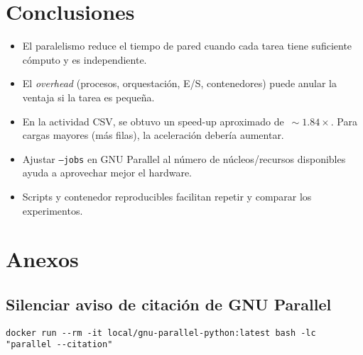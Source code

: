 \documentclass[11pt,a4paper]{article}
\newcommand{\code}[1]{\texttt{#1}}
\begin{document}
\section{Conclusiones}
\begin{itemize}
  \item El paralelismo reduce el tiempo de pared cuando cada tarea tiene suficiente cómputo y es independiente.
  \item El \emph{overhead} (procesos, orquestación, E/S, contenedores) puede anular la ventaja si la tarea es pequeña.
  \item En la actividad CSV, se obtuvo un speed-up aproximado de $\,\sim1.84\times$. Para cargas mayores (más filas), la aceleración debería aumentar.
  \item Ajustar \code{--jobs} en GNU Parallel al número de núcleos/recursos disponibles ayuda a aprovechar mejor el hardware.
  \item Scripts y contenedor reproducibles facilitan repetir y comparar los experimentos.
\end{itemize}

\section*{Anexos}
\subsection*{Silenciar aviso de citación de GNU Parallel}
\begin{lstlisting}[style=cmd]
docker run --rm -it local/gnu-parallel-python:latest bash -lc "parallel --citation"
\end{lstlisting}
\end{document}
